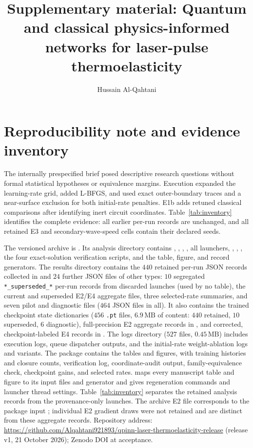 \documentclass[11pt]{article}
\title{Supplementary material: Quantum and classical physics-informed
networks for laser-pulse thermoelasticity}
\author{Hussain Al-Qahtani}
\date{}
\begin{document}
\maketitle

\section{Reproducibility note and evidence inventory}

The internally prespecified brief posed descriptive research questions
without formal statistical hypotheses or equivalence margins. Execution
expanded the learning-rate grid, added L-BFGS, and used exact outer-boundary
traces and a near-surface exclusion for both initial-rate penalties. E1b
adds retuned classical comparisons after identifying inert circuit
coordinates. Table~\ref{tab:inventory} identifies the complete evidence:
all earlier per-run records are unchanged, and all retained E3 and
secondary-wave-speed cells contain their declared seeds.

The versioned archive is
. Its analysis directory contains
, , ,
, all launchers, ,
, , the four
exact-solution verification scripts, and the table, figure, and record
generators. The results directory contains the $440$ retained per-run
JSON records collected in  and $24$ further JSON files
of other types: $10$ segregated \texttt{*\_superseded\_*} per-run records
from discarded launches (used by no table), the current and superseded
E2/E4 aggregate files, three selected-rate summaries, and seven pilot and
diagnostic files ($464$ JSON files in all).
It also contains the trained checkpoint state dictionaries
($456$ \texttt{.pt} files, $6.9\,\mathrm{MB}$ of content: $440$ retained,
$10$ superseded, $6$ diagnostic), full-precision E2
aggregate records in , and corrected,
checkpoint-labeled E4 records in .
The logs directory ($527$ files, $0.45\,\mathrm{MB}$) includes execution logs, queue
dispatcher outputs, and the initial-rate weight-ablation logs and variants.
The package contains the tables and figures,  with
training histories and closure counts, verification log, coordinate-audit
output, family-equivalence check, checkpoint gains, and selected rates.
 maps every manuscript table and figure to its input
files and generator and gives regeneration commands and launcher thread
settings. Table~\ref{tab:inventory} separates the retained analysis records
from the provenance-only launches. The archive E2 file corresponds to the
package input ; individual E2 gradient draws were not
retained and are distinct from these aggregate records.
Repository address: \url{https://github.com/Alqahtani921893/qpinn-laser-thermoelasticity-release} (release v1, 21 October 2026); Zenodo DOI at acceptance.
\end{document}
